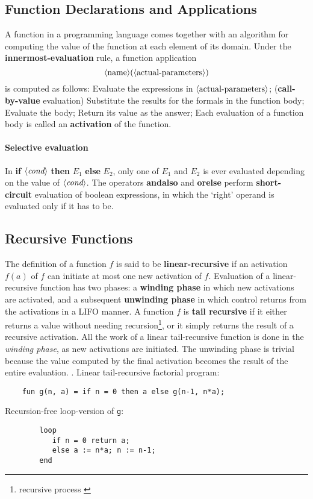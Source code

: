 \documentclass{article}
\begin{document}
\subsection{Function Declarations and Applications}
\bit
\w A function in a programming language comes together with an algorithm
	for computing the value of the function at each element of 
	its domain.
\w Under the {\bf{}innermost-evaluation} rule, a function application
	\[ \mbox{$\langle{\textit{\mbox{\em{}name}}}\rangle$} ( \mbox{$\langle{\textit{\mbox{\em{}actual-parameters}}}\rangle$} ) \]
	is computed as follows:
	\ben
	\w [(a)] Evaluate the expressions in 
		$\mbox{$\langle{\textit{\mbox{\em{}actual-parameters}}}\rangle$}$;
		({\bf{}call-by-value} evaluation)
	\w [(b)] Substitute the results for the 
		formals in the function body;
	\w [(c)] Evaluate the body;
	\w [(d)] Return its value as the answer;
	\een
\w Each evaluation of a function body is called an {\bf{}activation}
	of the function.
\eit
\paragraph{Selective evaluation}
\bit
\w In {\bf{}if} $\mbox{$\langle{\textit{cond}}\rangle$}$ {\bf{}then} $E_1$ {\bf{}else} $E_2$,
	only one of $E_1$ and $E_2$ is ever evaluated depending on 
	the value of $\mbox{$\langle{\textit{cond}}\rangle$}$.
\w The operators {\bf{}andalso} and {\bf{}orelse} perform
	{\bf{}short-circuit} evaluation of boolean expressions,
	in which the `right' operand is evaluated only if it has to be.
\eit


\subsection{Recursive Functions}
\bit
\w The definition of a function $f$ is said to be {\bf{}linear-recursive}
	if an activation $f(a)$ of $f$ can initiate at most
	one new activation of $f$.
\w Evaluation of a linear-recursive function has two phases:
	\bit
	\w a {\bf{}winding phase} in which new activations are activated, and
       	\w a subsequent {\bf{}unwinding phase} in which control returns
		from the activations in a LIFO manner.
	\eit
\w A function $f$ is {\bf{}tail recursive} if it either returns a value 
	without needing recursion\footnote{recursive process \cite{ASS85}}, 
	or it simply returns the result 
	of a recursive activation.
\w All the work of a linear tail-recursive function is done in the
	{\em{}winding phase\/}, 
	as new activations are initiated. The unwinding
	phase is trivial because the value computed by the final activation 
	becomes the result of the entire evaluation.
. 
	\bit
	\w Linear tail-recursive factorial program:
	\begin{verbatim}
	fun g(n, a) = if n = 0 then a else g(n-1, n*a);
	\end{verbatim}
	\w Recursion-free loop-version of {\tt{}g}:
	\begin{verbatim}
        loop
           if n = 0 return a;
           else a := n*a; n := n-1;
        end
	\end{verbatim}
	\eit
\eit
\end{document}

